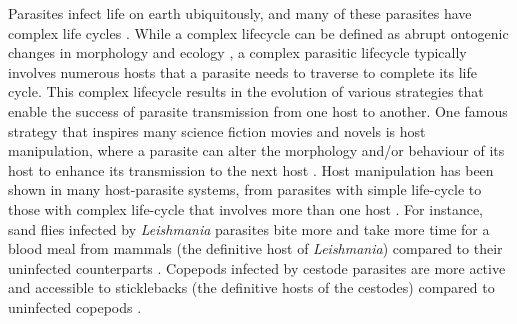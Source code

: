 \documentclass[11pt]{article}
\begin{document}
Parasites infect life on earth ubiquitously, and many of these parasites have complex life cycles \citep{zimmer:book:2001}. 
While a complex lifecycle can be defined as abrupt ontogenic changes in morphology and ecology \citep{Benesh:2016dj}, a complex parasitic lifecycle typically involves numerous hosts that a parasite needs to traverse to complete its life cycle. 
This complex lifecycle results in the evolution of various strategies that enable the success of parasite transmission from one host to another. 
One famous strategy that inspires many science fiction movies and novels is host manipulation, where a parasite can alter the morphology and/or behaviour of its  host to enhance its transmission to the next host \citep{Hughes2012}. 
Host manipulation has been shown in many host-parasite systems, from parasites with simple life-cycle to those with complex life-cycle that involves more than one host \citep{Hughes2012,molyneux1986}. 
For instance, sand flies infected by \textit{Leishmania} parasites bite more and take more time for a blood meal from mammals (the definitive host of \textit{Leishmania}) compared to their uninfected counterparts \citep{Rogers2007}. 
Copepods infected by cestode parasites are more active and accessible to sticklebacks (the definitive hosts of the cestodes) compared to uninfected copepods \citep{Wedekind1996}.
\end{document}
